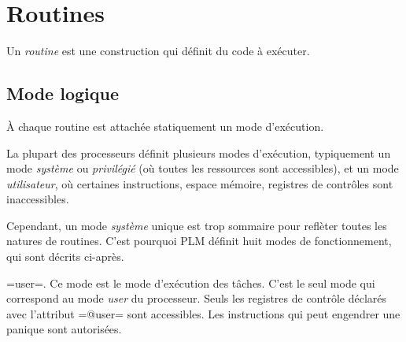 




\chapter{Routines}

Un \emph{routine} est une construction qui définit du code à exécuter.



\section{Mode logique}

À chaque routine est attachée statiquement un mode d'exécution.

La plupart des processeurs définit plusieurs modes d'exécution, typiquement un mode \emph{système} ou \emph{privilégié} (où toutes les ressources sont accessibles), et un mode \emph{utilisateur}, où certaines instructions, espace mémoire, registres de contrôles sont inaccessibles.

Cependant, un mode \emph{système} unique est trop sommaire pour reflèter toutes les natures de routines. C'est pourquoi PLM définit huit modes de fonctionnement, qui sont décrits ci-après.

\plm=user=. Ce mode est le mode d'exécution des tâches. C'est le seul mode qui correspond au mode \emph{user} du processeur. Seuls les registres de contrôle déclarés avec l'attribut \plm=@user= sont accessibles. Les instructions qui peut engendrer une panique sont autorisées.


